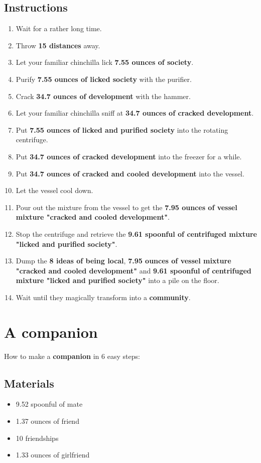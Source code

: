 \documentclass{article}
\begin{document}
\subsection{Instructions}\begin{enumerate}
\item 
Wait for a rather long time.
\item 
Throw \textbf{15 distances} away.
\item 
Let your familiar chinchilla lick \textbf{7.55 ounces of society}.
\item 
Purify \textbf{7.55 ounces of licked society} with the purifier.
\item 
Crack \textbf{34.7 ounces of development} with the hammer.
\item 
Let your familiar chinchilla sniff at \textbf{34.7 ounces of cracked development}.
\item 
Put \textbf{7.55 ounces of licked and purified society} into the rotating centrifuge.
\item 
Put \textbf{34.7 ounces of cracked development} into the freezer for a while.
\item 
Put \textbf{34.7 ounces of cracked and cooled development} into the vessel.
\item 
Let the vessel cool down.
\item 
Pour out the mixture from the vessel to get the \textbf{7.95 ounces of vessel mixture "cracked and cooled development"}.
\item 
Stop the centrifuge and retrieve the \textbf{9.61 spoonful of centrifuged mixture "licked and purified society"}.
\item 
Dump the \textbf{8 ideas of being local}, \textbf{7.95 ounces of vessel mixture "cracked and cooled development"} and \textbf{9.61 spoonful of centrifuged mixture "licked and purified society"} into a pile on the floor.
\item 
Wait until they magically transform into a \textbf{community}.
\end{enumerate}
\newpage
\section{A companion}How to make a \textbf{companion} in 6 easy steps:

\subsection{Materials}\begin{itemize}
\item 
9.52 spoonful of mate
\item 
1.37 ounces of friend
\item 
10 friendships
\item 
1.33 ounces of girlfriend
\end{itemize}
\end{document}
